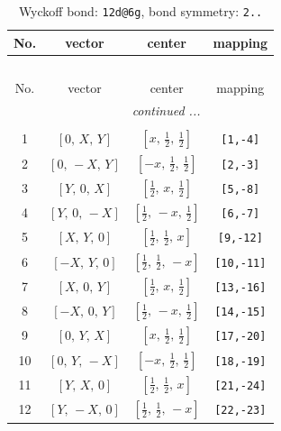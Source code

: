 \documentclass[fleqn,8pt]{jsarticle}
\begin{document}
\renewcommand{\arraystretch}{1.2}
\begin{longtable}{cccc}
\caption{Wyckoff bond: {\tt 12d@6g}, bond symmetry: {\tt 2..}}
 \\
 \hline \hline
No. & vector & center & mapping \\ \hline \endfirsthead

\multicolumn{3}{l}{\tablename\ \thetable{}} \\
 \hline \hline
No. & vector & center & mapping \\ \hline \endhead

 \hline \hline
\multicolumn{3}{r}{\footnotesize\it continued ...} \\ \endfoot

 \hline \hline
\multicolumn{3}{r}{} \\ \endlastfoot

1 & $\left[ 0,\, X,\, Y \right]$ & $\left[ x,\, \frac{1}{2},\, \frac{1}{2} \right]$ & {\tt [1,-4]} \\ \hline
2 & $\left[ 0,\, - X,\, Y \right]$ & $\left[ - x,\, \frac{1}{2},\, \frac{1}{2} \right]$ & {\tt [2,-3]} \\ \hline
3 & $\left[ Y,\, 0,\, X \right]$ & $\left[ \frac{1}{2},\, x,\, \frac{1}{2} \right]$ & {\tt [5,-8]} \\ \hline
4 & $\left[ Y,\, 0,\, - X \right]$ & $\left[ \frac{1}{2},\, - x,\, \frac{1}{2} \right]$ & {\tt [6,-7]} \\ \hline
5 & $\left[ X,\, Y,\, 0 \right]$ & $\left[ \frac{1}{2},\, \frac{1}{2},\, x \right]$ & {\tt [9,-12]} \\ \hline
6 & $\left[ - X,\, Y,\, 0 \right]$ & $\left[ \frac{1}{2},\, \frac{1}{2},\, - x \right]$ & {\tt [10,-11]} \\ \hline
7 & $\left[ X,\, 0,\, Y \right]$ & $\left[ \frac{1}{2},\, x,\, \frac{1}{2} \right]$ & {\tt [13,-16]} \\ \hline
8 & $\left[ - X,\, 0,\, Y \right]$ & $\left[ \frac{1}{2},\, - x,\, \frac{1}{2} \right]$ & {\tt [14,-15]} \\ \hline
9 & $\left[ 0,\, Y,\, X \right]$ & $\left[ x,\, \frac{1}{2},\, \frac{1}{2} \right]$ & {\tt [17,-20]} \\ \hline
10 & $\left[ 0,\, Y,\, - X \right]$ & $\left[ - x,\, \frac{1}{2},\, \frac{1}{2} \right]$ & {\tt [18,-19]} \\ \hline
11 & $\left[ Y,\, X,\, 0 \right]$ & $\left[ \frac{1}{2},\, \frac{1}{2},\, x \right]$ & {\tt [21,-24]} \\ \hline
12 & $\left[ Y,\, - X,\, 0 \right]$ & $\left[ \frac{1}{2},\, \frac{1}{2},\, - x \right]$ & {\tt [22,-23]} \\
\end{longtable}
\end{document}
